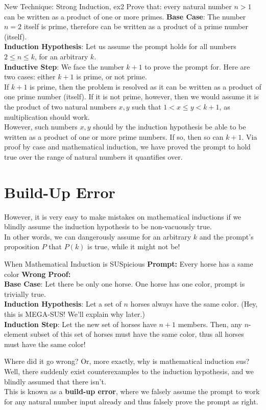 \begin{ln-think}{New Technique: Strong Induction, ex2}{}
    Prove that: every natural number $n > 1$ can be written as a product of one or more primes.
    \tcblower
    \textbf{Base Case}: The number $n = 2$ itself is prime, therefore can be written as a product of a prime number (itself). \\
    \textbf{Induction Hypothesis}: Let us assume the prompt holds for all numbers $2 \leq n \leq k$, for an arbitrary $k$. \\
    \textbf{Inductive Step}: We face the number $k + 1$ to prove the prompt for. Here are two cases: either $k + 1$ is prime, or not prime. \\
    If $k + 1$ is prime, then the problem is resolved as it can be written as a product of one prime number (itself). If it is not prime, however, then we would assume it is the product of two natural numbers $x, y$ such that $1 < x \leq y < k + 1$, as multiplication should work. \\
    However, such numbers $x, y$ should by the induction hypothesis be able to be written as a product of one or more prime numbers. If so, then so can $k + 1$. Via proof by case and mathematical induction, we have proved the prompt to hold true over the range of natural numbers it quantifies over.
\end{ln-think}

\section{Build-Up Error}
However, it is very easy to make mistakes on mathematical inductions if we blindly assume the induction hypothesis to be non-vacuously true. \\
In other words, we can dangerously assume for an arbitrary $k$ and the prompt's proposition $P$ that $P(k)$ is true, while it might not be!
\begin{ln-think}{When Mathematical Induction is SUSpicious}{}
    \textbf{Prompt:} Every horse has a same color
    \tcblower
    \textbf{Wrong Proof:} \\
    \textbf{Base Case}: Let there be only one horse. One horse has one color, prompt is trivially true. \\
    \textbf{Induction Hypothesis}: Let a set of $n$ horses always have the same color. (Hey, this is MEGA-SUS! We'll explain why later.) \\
    \textbf{Induction Step}: Let the new set of horses have $n + 1$ members. Then, any $n$-element subset of this set of horses must have the same color, thus all horses must have the same color!
\end{ln-think}
Where did it go wrong? Or, more exactly, why is mathematical induction sus? Well, there suddenly exist counterexamples to the induction hypothesis, and we blindly assumed that there isn't. \\
This is known as a \textbf{build-up error}, where we falsely assume the prompt to work for any natural number input already and thus falsely prove the prompt as right.

